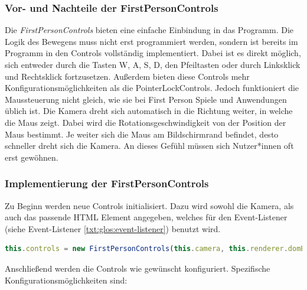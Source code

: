 \subsubsection{Vor- und Nachteile der FirstPersonControls}

Die \emph{FirstPersonControls} bieten eine einfache Einbindung in das Programm. Die Logik des Bewegens muss nicht erst programmiert werden, sondern ist bereits im Programm in den Controls vollständig implementiert. Dabei ist es direkt möglich, sich entweder durch die Tasten W, A, S, D, den Pfeiltasten oder durch Linksklick und Rechtsklick fortzusetzen. Außerdem bieten diese Controls mehr Konfigurationsmöglichkeiten als die PointerLockControls. Jedoch funktioniert die Maussteuerung nicht gleich, wie sie bei First Person Spiele und Anwendungen üblich ist. Die Kamera dreht sich automatisch in die Richtung weiter, in welche die Maus zeigt. Dabei wird die Rotationsgeschwindigkeit von der Position der Maus bestimmt. Je weiter sich die Maus am Bildschirmrand befindet, desto schneller dreht sich die Kamera. An dieses Gefühl müssen sich Nutzer*innen oft erst gewöhnen.

\subsubsection{Implementierung der FirstPersonControls}
Zu Beginn werden neue Controls initialisiert. Dazu wird sowohl die Kamera, als auch das passende HTML Element angegeben, welches für den Event-Listener (siehe Event-Listener \ref{txt:glos:event-listener}) benutzt wird. 

\begin{lstlisting}[caption={FirstPersonControls initialisieren},language=TypeScript]
    this.controls = new FirstPersonControls(this.camera, this.renderer.domElement)
    \end{lstlisting}

Anschließend werden die Controls wie gewünscht konfiguriert. Spezifische Konfigurationsmöglichkeiten sind: 

